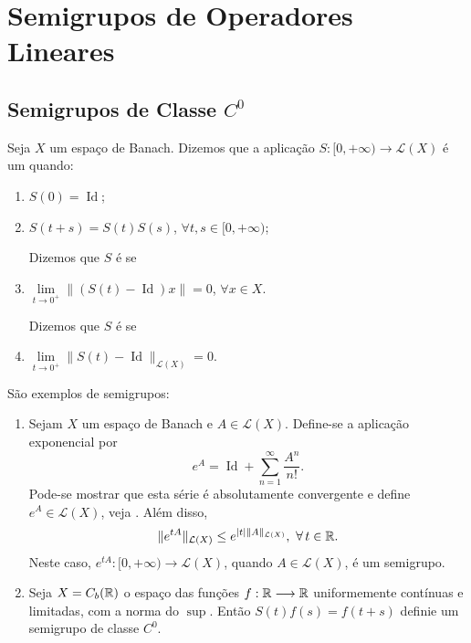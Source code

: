 \chapter{Semigrupos de Operadores Lineares}

\section{Semigrupos de Classe $C^0$}



\begin{definition}\label{def-semigrupo}
     Seja $X$ um espaço de Banach. Dizemos que a aplicação $S:[0,+\infty)\longrightarrow \mathcal{L}(X)$ é um   quando:
\begin{enumerate}
    \item $S(0)=\operatorname{Id}$;
    \item $S(t+s)=S(t)S(s)$, $\forall t,s\in [0,+\infty)$;

Dizemos que $S$ é  se

    \item $\lim\limits_{t\to0^+} \|(S(t)-\operatorname{Id})x\|=0$, $\forall x\in X$.

Dizemos que $S$ é  se 

\item $\lim\limits_{t\to 0^+}\|S(t)-\operatorname{Id}\|_{\mathcal{L}(X)}=0$.
\end{enumerate}
\end{definition}

   \begin{example} São exemplos de semigrupos:
        \begin{enumerate}
            \item Sejam $X$ um espaço de Banach e  $A\in \mathcal{L}(X)$. Define-se a aplicação exponencial por
            \[e^{A}=\operatorname{Id}+\sum_{n=1}^\infty \frac{A^n}{n!}.\]
Pode-se mostrar que esta série é absolutamente convergente e 
define $e^{A}\in \mathcal{L}(X)$, veja \cite[Apêndice 
2]{gomes1985semigrupos}. Além disso, 
\begin{equation*}
\nl{e^{tA}}\leq e^{|t|\nl{A}},\ \forall\, t\in \R.
\end{equation*}
Neste caso,  $e^{tA}:[0,+\infty)\to \mathcal{L}(X)$, quando $A\in \mathcal{L}(X)$, é um semigrupo.
            \item Seja $X=C_b(\mathbb{R})$  o espaço das funções $f:\mathbb{R}\longrightarrow \mathbb{R}$ uniformemente contínuas e limitadas, com a norma do $\sup$. Então $S(t)f(s)=f(t+s)$ definie um semigrupo de classe $C^0$.
        \end{enumerate}
    \end{example}


